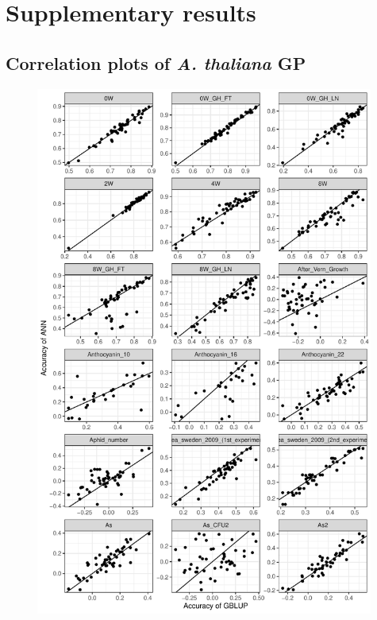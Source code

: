 
\chapter{Supplementary results} %

\label{AppendixD} %

\section{Correlation plots of \textit{A. thaliana} GP}  \label{AC:gp_res}
  
\begin{figure}[H]
  \centering \includegraphics[height=0.79\textheight, width=0.99\textwidth]{Figures/gray_cor_plots_0}
  \decoRule
 \label{fig:bla}
\end{figure}

